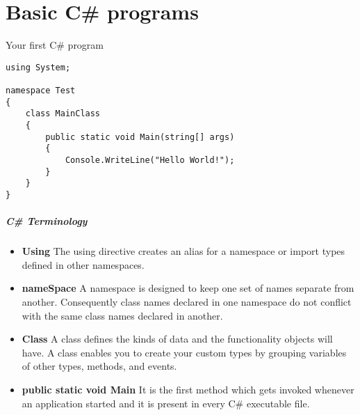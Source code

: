 \newcommand{\codeslide}[2]{
	\begin{columns}
		\begin{column}{0.48\textwidth}
			
		\end{column}
		
		\begin{column}{0.48\textwidth}
			\begin{center}
				\colorbox{white}{
					\color{black}
					\begin{tabular}{|c|c|}
						\hline
						\textbf{Variable} & \textbf{Value} \\\hline
						#2
					\end{tabular}
				}
			\end{center}
		\end{column}
	\end{columns}
}

\newcommand{\trow}[1]{ & \\ \texttt{#1} & \\ & \\\hline}

\part{Basic C\# programs}

\frame{\partpage}

\begin{frame}[fragile]{Your first C\# program}
\begin{lstlisting}
using System;

namespace Test
{
    class MainClass
    {
        public static void Main(string[] args)
        {
            Console.WriteLine("Hello World!");
        }
    }
}
\end{lstlisting}
\end{frame}

\begin{frame}
	\frametitle{C\# Terminology}
	\small
	\begin{itemize}
	\item \textbf{Using} The using directive creates an alias for a namespace or import types defined in other namespaces.
	\item \textbf{nameSpace} A namespace is designed to keep one set of names separate from another. Consequently class names declared in one namespace do not conflict with the same class names declared in another.
	\item \textbf{Class} A class defines the kinds of data and the functionality objects will have. A class enables you to create your custom types by grouping variables of other types, methods, and events.
	\item \textbf{public static void Main} It is the first method which gets invoked whenever an application started and it is present in every C\# executable file.
	\end{itemize}
\end{frame}
	


